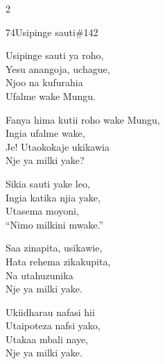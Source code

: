 \begin{multicols}{2}
\begin{hymn}{74}{Usipinge sauti}{\#142}
\begin{stanza}
Usipinge sauti ya roho,\\
Yesu anangoja, uchague,\\
Njoo na kufurahia\\
Ufalme wake Mungu.
\end{stanza}
\begin{chorus}
Fanya hima kutii roho wake Mungu,\\
Ingia ufalme wake,\\
Je! Utaokokaje ukikawia\\
Nje ya milki yake?
\end{chorus}
\begin{stanza}
Sikia sauti yake leo,\\
Ingia katika njia yake,\\
Utasema moyoni,\\
``Nimo milkini mwake.''
\end{stanza}
\begin{stanza}
Saa zinapita, usikawie,\\
Hata rehema zikakupita,\\
Na utahuzunika\\
Nje ya milki yake.
\end{stanza}
\begin{stanza}
Ukiidharau nafasi hii\\
Utaipoteza nafsi yako,\\
Utakaa mbali naye,\\
Nje ya milki yake.
\end{stanza}
\end{hymn}


\end{multicols}
